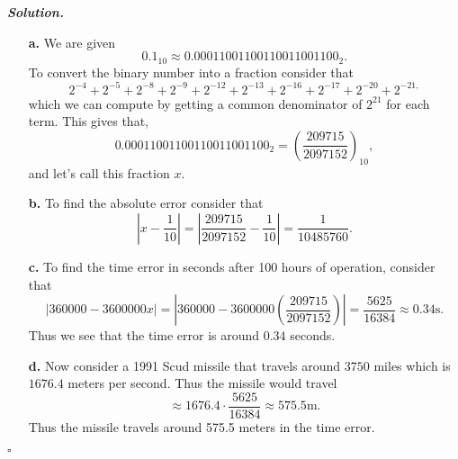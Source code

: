 \documentclass[12pt]{report}
\newenvironment{solution}[1][\it{Solution}]{\textbf{#1. } }{$\square$}
\newcommand{\paren}[1]{{\left(#1\right)}} %
\newcommand{\abs}[1]{{\left|#1\right|}} %
\begin{document}
\begin{solution}
    \noindent
    \begin{enumerate}
        \item [{\bf a.}]
        We are given
        \[ 0.1_{10} \approx 0.00011001100110011001100_2.\]
        To convert the binary number into a fraction consider that
        \[ 2^{-4} + 2^{-5} + 2^{-8} + 2^{-9} + 2^{-12} + 2^{-13} + 2^{-16} + 2^{-17} + 2^{-20} + 2^{-21,}\]
        which we can compute by getting a common denominator of $2^{21}$ for each term. This gives that,
        \[0.00011001100110011001100_2 = \paren{\frac{209715}{2097152}}_{10},\]
        and let's call this fraction $x$.

        \item [{\bf b.}]
        To find the absolute error consider that
        \[ \abs{x - \frac{1}{10}} = \abs{\frac{209715}{2097152} - \frac{1}{10}}  = \frac{1}{10485760}.\]
        
        \item [{\bf c.}]
        To find the time error in seconds after 100 hours of operation, consider that
        \[ \abs{360000 - 3600000x}  = \abs{360000 - 3600000\paren{\frac{209715}{2097152}}} = \frac{5625}{16384} \approx 0.34 \text{s}.\] 
        Thus we see that the time error is around $0.34$ seconds.

        \item [{\bf d.}]
        Now consider a 1991 Scud missile that travels around $3750$ miles which is $1676.4$ meters per second. Thus the missile would travel
        \[ \approx 1676.4 \cdot \frac{5625}{16384} \approx 575.5 \text{m}.\]
        Thus the missile travels around 575.5 meters in the time error. 

    \end{enumerate}
\end{solution}

\newpage
\end{document}
